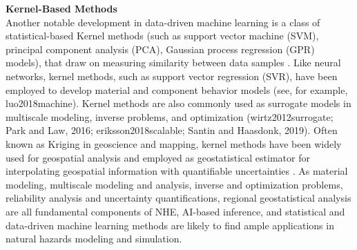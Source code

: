 \noindent\textbf{Kernel-Based Methods} \\Another notable development in data-driven machine learning is a class of statistical-based Kernel methods (such as support vector machine (SVM), principal component analysis (PCA), Gaussian process regression (GPR) models), that draw on measuring similarity between data samples \citep{rasmussen2006gaussian,hofmann2008kernel}. Like neural networks, kernel methods, such as support vector regression (SVR), have been employed to develop material and component behavior models (see, for example, luo2018machine). Kernel methods are also commonly used as surrogate models in multiscale modeling, inverse problems, and optimization (wirtz2012surrogate; Park and Law, 2016; eriksson2018scalable; Santin and Haasdonk, 2019). Often known as Kriging in geoscience and mapping, kernel methods have been widely used for geospatial analysis and employed as geostatistical estimator for interpolating geospatial information with quantifiable uncertainties \citep{olea2012geostatistics,jia2016surrogate}. As material modeling, multiscale modeling and analysis, inverse and optimization problems, reliability analysis and uncertainty quantifications, regional geostatistical analysis are all fundamental components of NHE, AI-based inference, and statistical and data-driven machine learning methods are likely to find ample applications in natural hazards modeling and simulation. 
\newline

